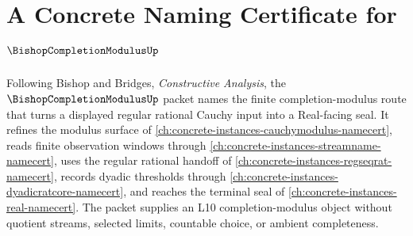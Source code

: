 \chapter{A Concrete Naming Certificate for $\BishopCompletionModulusUp$}
\label{ch:concrete-instances-bishopcompletionmodulus-namecert}

Following Bishop and Bridges, \emph{Constructive Analysis}, the $\BishopCompletionModulusUp$ packet names the finite completion-modulus route that turns a displayed regular rational Cauchy input into a Real-facing seal. It refines the modulus surface of \autoref{ch:concrete-instances-cauchymodulus-namecert}, reads finite observation windows through \autoref{ch:concrete-instances-streamname-namecert}, uses the regular rational handoff of \autoref{ch:concrete-instances-regseqrat-namecert}, records dyadic thresholds through \autoref{ch:concrete-instances-dyadicratcore-namecert}, and reaches the terminal seal of \autoref{ch:concrete-instances-real-namecert}. The packet supplies an L10 completion-modulus object without quotient streams, selected limits, countable choice, or ambient completeness.


